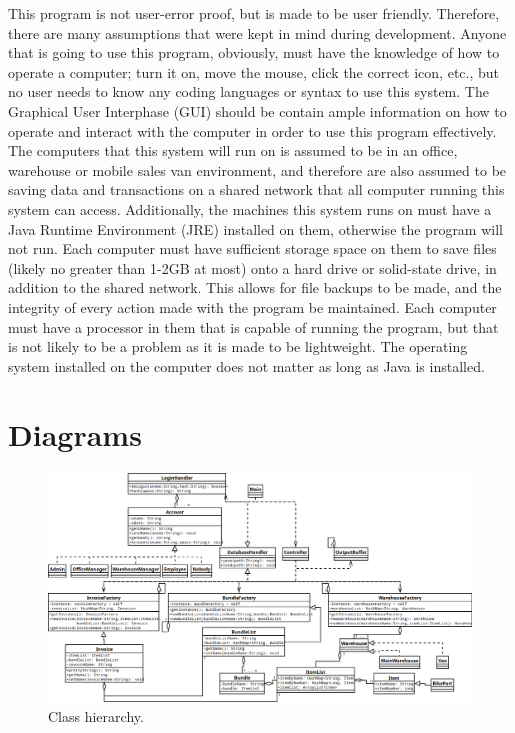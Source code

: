 \documentclass{report}
\begin{document}
This program is not user-error proof, but is made to be user friendly. Therefore, there are many assumptions that were kept in mind during development. Anyone that is going to use this program, obviously, must have the knowledge of how to operate a computer; turn it on, move the mouse, click the correct icon, etc., but no user needs to know any coding languages or syntax to use this system. The Graphical User Interphase (GUI) should be contain ample information on how to operate and interact with the computer in order to use this program effectively. The computers that this system will run on is assumed to be in an office, warehouse or mobile sales van environment, and therefore are also assumed to be saving data and transactions on a shared network that all computer running this system can access. Additionally, the machines this system runs on must have a Java Runtime Environment (JRE) installed on them, otherwise the program will not run. Each computer must have sufficient storage space on them to save files (likely no greater than 1-2GB at most) onto a hard drive or solid-state drive, in addition to the shared network. This allows for file backups to be made, and the integrity of every action made with the program be maintained. Each computer must have a processor in them that is capable of running the program, but that is not likely to be a problem as it is made to be lightweight. The operating system installed on the computer does not matter as long as Java is installed.\par

\section{Diagrams}

\begin{figure}
  \centering
    \includegraphics[width=\textwidth,height=\textheight,keepaspectratio]{../diagrams/image_versions/overview.png}
    \caption{Class hierarchy.}
\end{figure}
\end{document}
